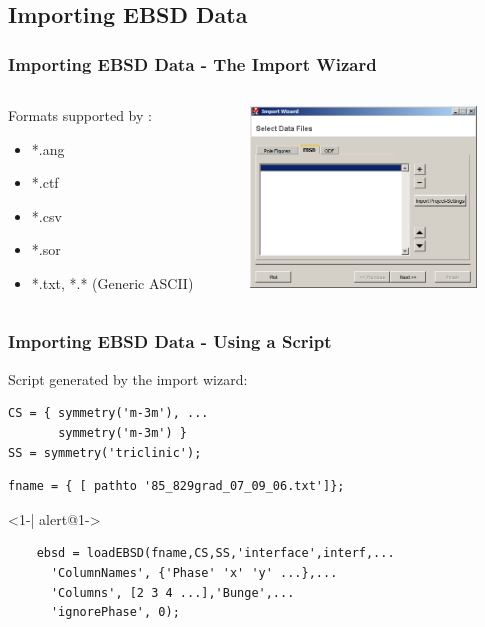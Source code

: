 \subsection*{Importing EBSD Data}
\begin{frame}[fragile]
  \frametitle{Importing EBSD Data - The Import Wizard}

  \begin{columns}

    \begin{column}{6cm}
      Formats supported by \MTEX:
      \begin{itemize}
      \item *.ang
      \item *.ctf
      \item *.csv
      \item *.sor
      \item *.txt, *.* (Generic ASCII)
      \end{itemize}

    \end{column}


    \begin{column}{6cm}
      \includegraphics[width=6cm]{pic/iw2}
    \end{column}

  \end{columns}

\end{frame}


\begin{frame}[fragile]
  \frametitle{Importing EBSD Data - Using a Script}

Script generated by the import wizard:

\begin{lstlisting}
CS = { symmetry('m-3m'), ...
       symmetry('m-3m') }
SS = symmetry('triclinic');
\end{lstlisting}

\begin{lstlisting}
fname = { [ pathto '85_829grad_07_09_06.txt']};
\end{lstlisting}

\begin{actionenv}<1-| alert@1->
\begin{lstlisting}
	ebsd = loadEBSD(fname,CS,SS,'interface',interf,...
	  'ColumnNames', {'Phase' 'x' 'y' ...},...
	  'Columns', [2 3 4 ...],'Bunge',...
	  'ignorePhase', 0);
\end{lstlisting}
\end{actionenv}

\end{frame}

